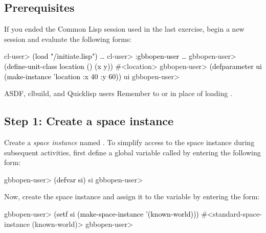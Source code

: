 \documentclass[10pt,twoside,english,pdftex]{article}
\begin{document}
\fndocrule

\subsection*{Prerequisites}

%
%
%
If you ended the Common Lisp session used in the last exercise, begin a new
session and evaluate the following forms:
%
\W\supp
\begin{example}
\textcolor{darkergray}{%
  cl-user> \textcolor{black}{(load "/initiate.lisp")}
     \textrm{\ldots{}}
  cl-user> \textcolor{black}{:gbbopen-user}
     \textrm{\ldots{}}
  gbbopen-user> \textcolor{black}{(define-unit-class location ()
                  (x y))}
  #<location>
  gbbopen-user> \textcolor{black}{(defparameter ui (make-instance 'location :x 40 :y 60))}
  ui
  gbbopen-user>}
\end{example}

%
%
\begin{notebox}{ASDF, clbuild, and Quicklisp users}
  Remember to  or
   in place of loading
  .
\end{notebox}

\subsection*{Step 1: Create a space instance}

%
%
Create a \textit{space instance\/} named .  To
simplify access to the space instance during subsequent activities, first
define a global variable called  by entering the following form:
%
\W\supp
\begin{example}
\textcolor{darkergray}{%
  gbbopen-user> \textcolor{black}{(defvar si)}
  si
  gbbopen-user>}
\end{example}

%
%
Now, create the space instance and assign it to the variable  by
entering the form:
%
\W\supp
\begin{example}
\textcolor{darkergray}{%
  gbbopen-user> \textcolor{black}{(setf si (make-space-instance '(known-world)))}
  #<standard-space-instance (known-world)>
  gbbopen-user>}
\end{example}
\end{document}
